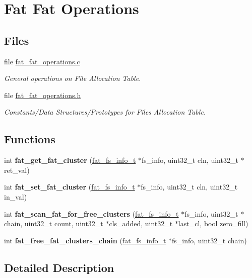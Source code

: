 \hypertarget{group__libfs__ffo}{}\section{Fat Fat Operations}
\label{group__libfs__ffo}
\subsection*{Files}
\begin{DoxyCompactItemize}
\item 
file \mbox{\hyperlink{fat__fat__operations_8c}{fat\+\_\+fat\+\_\+operations.\+c}}
\begin{DoxyCompactList}\small\item\em General operations on File Allocation Table. \end{DoxyCompactList}\item 
file \mbox{\hyperlink{fat__fat__operations_8h}{fat\+\_\+fat\+\_\+operations.\+h}}
\begin{DoxyCompactList}\small\item\em Constants/\+Data Structures/\+Prototypes for Files Allocation Table. \end{DoxyCompactList}\end{DoxyCompactItemize}
\subsection*{Functions}
\begin{DoxyCompactItemize}
\item 
\mbox{\label{group__libfs__ffo_ga5512453a5308ed7a2b32360556ef894a}} 
int {\bfseries fat\+\_\+get\+\_\+fat\+\_\+cluster} (\mbox{\hyperlink{structfat__fs__info__s}{fat\+\_\+fs\+\_\+info\+\_\+t}} $\ast$fs\+\_\+info, uint32\+\_\+t cln, uint32\+\_\+t $\ast$ret\+\_\+val)
\item 
\mbox{\label{group__libfs__ffo_gaa57f20483b471fd005abf5aa47be9bc5}} 
int {\bfseries fat\+\_\+set\+\_\+fat\+\_\+cluster} (\mbox{\hyperlink{structfat__fs__info__s}{fat\+\_\+fs\+\_\+info\+\_\+t}} $\ast$fs\+\_\+info, uint32\+\_\+t cln, uint32\+\_\+t in\+\_\+val)
\item 
\mbox{\label{group__libfs__ffo_ga50841857d0f7f371a54f445b76f889f4}} 
int {\bfseries fat\+\_\+scan\+\_\+fat\+\_\+for\+\_\+free\+\_\+clusters} (\mbox{\hyperlink{structfat__fs__info__s}{fat\+\_\+fs\+\_\+info\+\_\+t}} $\ast$fs\+\_\+info, uint32\+\_\+t $\ast$chain, uint32\+\_\+t count, uint32\+\_\+t $\ast$cls\+\_\+added, uint32\+\_\+t $\ast$last\+\_\+cl, bool zero\+\_\+fill)
\item 
\mbox{\label{group__libfs__ffo_ga59ca14cb35374273ef7a3d6f57c7f607}} 
int {\bfseries fat\+\_\+free\+\_\+fat\+\_\+clusters\+\_\+chain} (\mbox{\hyperlink{structfat__fs__info__s}{fat\+\_\+fs\+\_\+info\+\_\+t}} $\ast$fs\+\_\+info, uint32\+\_\+t chain)
\end{DoxyCompactItemize}


\subsection{Detailed Description}
